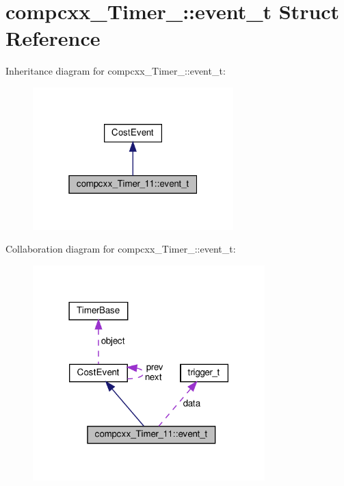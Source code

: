 \hypertarget{structcompcxx__Timer__11_1_1event__t}{}\section{compcxx\+\_\+\+Timer\+\_\+:\+:event\+\_\+t Struct Reference}
\label{structcompcxx__Timer__11_1_1event__t}


Inheritance diagram for compcxx\+\_\+\+Timer\+\_\+:\+:event\+\_\+t\+:\nopagebreak
\begin{figure}[H]
\begin{center}
\leavevmode
\includegraphics[width=220pt]{structcompcxx__Timer__11_1_1event__t__inherit__graph}
\end{center}
\end{figure}


Collaboration diagram for compcxx\+\_\+\+Timer\+\_\+:\+:event\+\_\+t\+:\nopagebreak
\begin{figure}[H]
\begin{center}
\leavevmode
\includegraphics[width=254pt]{structcompcxx__Timer__11_1_1event__t__coll__graph}
\end{center}
\end{figure}
